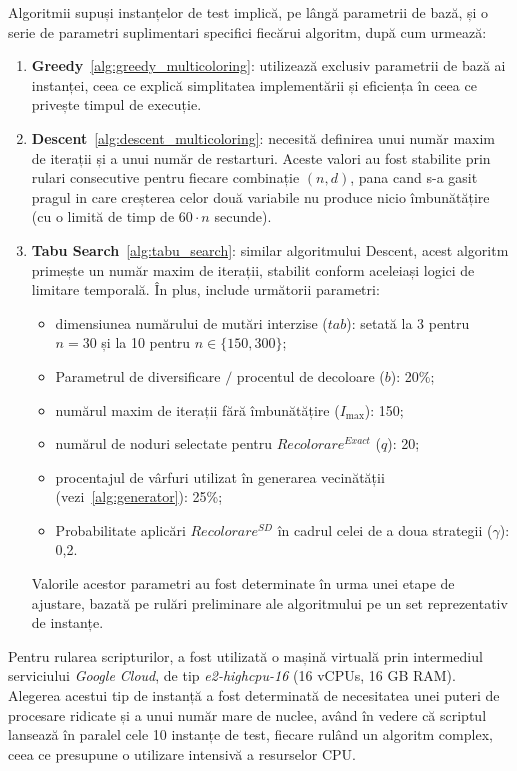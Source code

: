 Algoritmii supuși instanțelor de test implică, pe lângă parametrii de bază, și o serie de parametri suplimentari specifici fiecărui algoritm, după cum urmează:
\begin{enumerate}
  \item \textbf{Greedy}~\ref{alg:greedy_multicoloring}: utilizează exclusiv parametrii de bază ai instanței, ceea ce explică simplitatea implementării și eficiența în ceea ce privește timpul de execuție.

  \item \textbf{Descent}~\ref{alg:descent_multicoloring}: necesită definirea unui număr maxim de iterații și a unui număr de restarturi. Aceste valori au fost stabilite prin rulari consecutive pentru fiecare combinație $(n,d)$, pana cand s-a gasit pragul in care creșterea celor două variabile nu produce nicio îmbunătățire (cu o limită de timp de $60 \cdot n$ secunde).
  \item \textbf{Tabu Search}~\ref{alg:tabu_search}: similar algoritmului Descent, acest algoritm primește un număr maxim de iterații, stabilit conform aceleiași logici de limitare temporală. În plus, include următorii parametri:
  \begin{itemize}
    \item dimensiunea numărului de mutări interzise ($tab$): setată la 3 pentru $n = 30$ și la 10 pentru $n \in \{150, 300\}$;
    \item Parametrul de diversificare $/$ procentul de decoloare ($b$): 20\%;
    \item numărul maxim de iterații fără îmbunătățire ($I_{\max}$): 150;
    \item numărul de noduri selectate pentru $Recolorare^{Exact}$ ($q$): 20;
    \item procentajul de vârfuri utilizat în generarea vecinătății (vezi~\ref{alg:generator}): 25\%;
    \item Probabilitate aplicări $Recolorare^{SD}$ în cadrul celei de a doua strategii ($\gamma$): 0{,}2.
  \end{itemize}
  Valorile acestor parametri au fost determinate în urma unei etape de ajustare, bazată pe rulări preliminare ale algoritmului pe un set reprezentativ de instanțe.
\end{enumerate}


Pentru rularea scripturilor, a fost utilizată o mașină virtuală prin intermediul serviciului \textit{Google Cloud}, de tip \textit{e2-highcpu-16} (16 vCPUs, 16 GB RAM). Alegerea acestui tip de instanță a fost determinată de necesitatea unei puteri de procesare ridicate și a unui număr mare de nuclee, având în vedere că scriptul lansează în paralel cele 10 instanțe de test, fiecare rulând un algoritm complex, ceea ce presupune o utilizare intensivă a resurselor CPU.\

